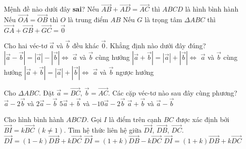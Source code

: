 \begin{ex}%
	Mệnh đề nào dưới đây \textbf{sai}?
	{Nếu $\vec{AB}+\vec{AD}=\vec{AC}$ thì $ABCD$ là hình bình hành}
	{\True Nếu $\vec{OA}=\vec{OB}$ thì $O$ là trung điểm $AB$}
	{Nếu $G$ là trọng tâm $\Delta ABC$ thì $\vec{GA}+\vec{GB}+\vec{GC}=\vec{0}$}
\end{ex}

\begin{ex}%
	Cho hai véc-tơ $\vec{a}$ và $\vec{b}$ đều khác $\vec{0}$. Khẳng định nào dưới đây đúng?
	{$\left|\vec{a}-\vec{b}\right|=\left|\vec{a}\right|-\left|\vec{b}\right|\Leftrightarrow$ $\vec{a}$ và $\vec{b}$ cùng hướng}
	{\True $\left|\vec{a}+\vec{b}\right|=\left|\vec{a}\right|+\left|\vec{b}\right|\Leftrightarrow$ $\vec{a}$ và $\vec{b}$ cùng hướng}
	{$\left|\vec{a}+\vec{b}\right|=\left|\vec{a}\right|+\left|\vec{b}\right|\Leftrightarrow$ $\vec{a}$ và $\vec{b}$ ngược hướng}
\end{ex}

\begin{ex}%
	Cho $\Delta ABC$. Đặt $\vec{a}=\vec{BC}$, $\vec{b}=\vec{AC}$. Các cặp véc-tơ nào sau đây cùng phương?
	{$\vec{a}-2\vec{b}$ và $2\vec{a}-\vec{b}$}
	{\True $5\vec{a}+\vec{b}$ và $-10\vec{a}-2\vec{b}$}
	{$\vec{a}+\vec{b}$ và $\vec{a}-\vec{b}$}
\end{ex}

\begin{ex}%
	Cho hình bình hành $ABCD$. Gọi $I$ là điểm trên cạnh $BC$ được xác định bởi $\vec{BI}=k\vec{BC} ~(k\neq 1)$. Tìm hệ thức liên hệ giữa $\vec{DI}$, $\vec{DB}$, $\vec{DC}$.
	{\True $\vec{DI}=(1-k)\vec{DB}+ k\vec{DC}$}
	{$\vec{DI}=(1+k)\vec{DB}-k\vec{DC}$}
	{$\vec{DI}=(1+k)\vec{DB}+k\vec{DC}$}
\end{ex}

